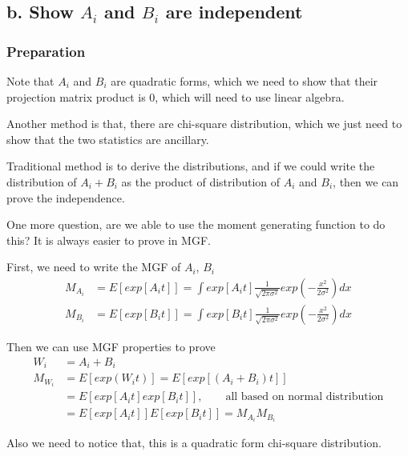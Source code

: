 \documentclass[11pt]{article} %
\begin{document}
\subsection{b. Show $A_i$ and $B_i$ are independent}

\subsubsection{Preparation}
Note that $A_i$ and $B_i$ are quadratic forms, which we need to show that their projection matrix product is 0, which will need to use linear algebra.

Another method is that, there are chi-square distribution, which we just need to show that the two statistics are ancillary.

Traditional method is to derive the distributions, and if we could write the distribution of $A_i + B_i$ as the product of distribution of $A_i$ and $B_i$, then we can prove the independence. 

One more question, are we able to use the moment generating function to do this? It is always easier to prove in MGF.

First, we need to write the MGF of $A_i$, $B_i$
\begin{align*}
	M_{A_i} & =E[exp[A_i t]] = \int exp[A_i t] \frac{1}{\sqrt{2 \pi \sigma^2}} exp(-\frac{x^2}{2 \sigma^2}) dx\\
	M_{B_i} & =E[exp[B_i t]] = \int exp[B_i t] \frac{1}{\sqrt{2 \pi \sigma^2}} exp(-\frac{x^2}{2 \sigma^2}) dx
\end{align*} 

Then we can use MGF properties to prove
\begin{align*}
	W_i & = A_i + B_i\\
	M_{W_i} &= E[exp(W_i t)] = E[exp[(A_i + B_i) t]] \\
	&= E[exp[A_i t] exp[B_i t]], \qquad \text{all based on normal distribution} \\
	&= E[exp[A_i t]] E[exp[B_i t]] = M_{A_i} M_{B_i}
\end{align*} 

Also we need to notice that, this is a quadratic form chi-square distribution.
\end{document}
